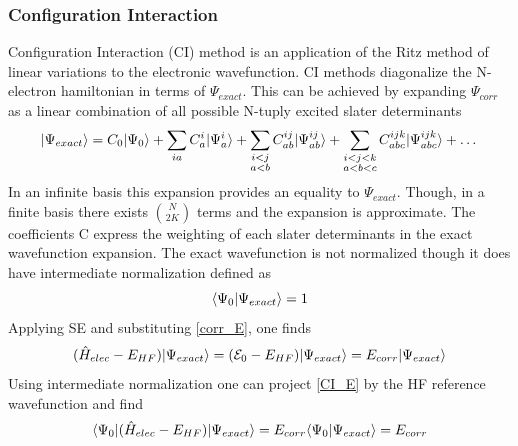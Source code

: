    \subsubsection{Configuration Interaction}
      Configuration Interaction (CI) method is an application of the Ritz method of linear variations to the electronic wavefunction\cite{Shavitt1977,Ritz1909,Szabo1998}. CI methods diagonalize the N-electron hamiltonian in terms of $\Psi_{exact}$.  This can be achieved by expanding $\Psi_{corr}$ as a linear combination of all possible N-tuply excited slater determinants%
        \begin{equation}\label{CI_wfn}
      	  | \Psi_{exact} \rangle = C_0| \Psi_0 \rangle + \sum_{ia} C^i_a | \Psi^i_a \rangle + \sum_{\substack{i<j\\  a<b}} C^{ij}_{ab} | \Psi^{ij}_{ab} \rangle + \sum_{\substack{i<j<k \\ a<b<c}} C_{abc}^{ijk} | \Psi_{abc}^{ijk} \rangle + \dots 
        \end{equation}
      In an infinite basis this expansion provides an equality to $\Psi_{exact}$.  Though, in a finite basis there exists $\binom{N}{2K}$\cite{Szabo 1998} terms and the expansion is approximate. The coefficients C express the weighting of each slater determinants in the exact wavefunction expansion.  The exact wavefunction is not normalized though it does have intermediate normalization\cite{Szabo 1998} defined as 
        \begin{equation}
        \langle\Psi_0|\Psi_{exact}\rangle = 1
        \end{equation}
      Applying SE and substituting \cref{corr_E}, one finds
        \begin{equation} \label{CI_E}
        	(\hat{H}_{elec} - E_{HF})| \Psi_{exact} \rangle = (\mathcal{E}_0 - E_{HF})| \Psi_{exact} \rangle = E_{corr} | \Psi_{exact} \rangle
        \end{equation}
      Using intermediate normalization one can project \cref{CI_E} by the HF reference wavefunction and find 
        \begin{equation}
      	  \langle\Psi_0 |(\hat{H}_{elec} - E_{HF})| \Psi_{exact} \rangle = E_{corr}\langle\Psi_0|\Psi_{exact}\rangle = E_{corr}
        \end{equation}
